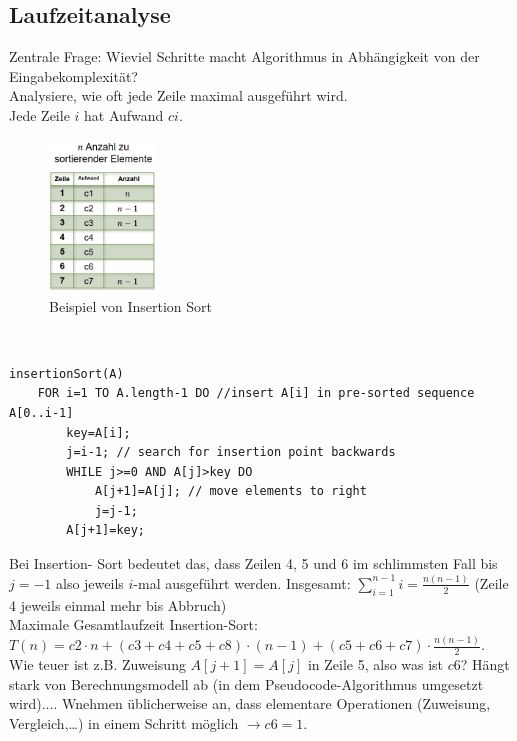 \documentclass{article}
\begin{document}
        \subsection{Laufzeitanalyse}
            Zentrale Frage: Wieviel Schritte macht Algorithmus in Abhängigkeit von der Eingabekomplexität?\\
            Analysiere, wie oft jede Zeile maximal ausgeführt wird.\\
            Jede Zeile $i$ hat Aufwand $ci$.\\
            \begin{figure}[ht]
                \centering
                \includegraphics[width=0.25\textwidth]{Bilder/InsSortLZ.png}
                \caption{Beispiel von Insertion Sort}
                \label{fig:InsSortLZ}
            \end{figure}\\
            \begin{lstlisting}[style=pseudocode]
insertionSort(A)
    FOR i=1 TO A.length-1 DO //insert A[i] in pre-sorted sequence A[0..i-1]
        key=A[i];
        j=i-1; // search for insertion point backwards
        WHILE j>=0 AND A[j]>key DO
            A[j+1]=A[j]; // move elements to right
            j=j-1;
        A[j+1]=key;
            \end{lstlisting}
            Bei Insertion- Sort bedeutet das, dass Zeilen 4, 5 und 6 im schlimmsten Fall bis $j=-1$ also jeweils $i$-mal ausgeführt werden. Insgesamt: $\sum_{i=1}^{n-1}i=\frac{n(n-1)}{2}$ (Zeile 4 jeweils einmal mehr bis Abbruch)\\
            Maximale Gesamtlaufzeit Insertion-Sort: $T(n)=c2\cdot n+(c3+c4+c5+c8)\cdot (n-1)+(c5+c6+c7)\cdot \frac{n(n-1)}{2}$.
            Wie teuer ist z.B. Zuweisung $A[j+1]=A[j]$ in Zeile 5, also was ist $c6$? Hängt stark von Berechnungsmodell ab (in dem Pseudocode-Algorithmus umgesetzt wird)$\dots$. Wnehmen üblicherweise an, dass elementare Operationen (Zuweisung, Vergleich,…) in einem Schritt möglich $\rightarrow c6=1$.\\
\end{document}
